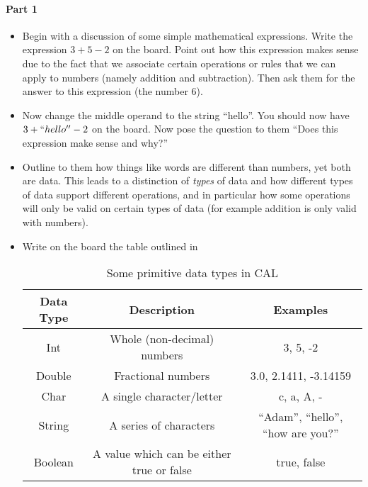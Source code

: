 	{
		\paragraph{Part 1}
		
		\begin{itemize}
			\item Begin with a discussion of some simple mathematical expressions.  Write the expression \(3 + 5 - 2\) on the board.  Point out how this expression makes sense due to the fact that we associate certain operations or rules that we can apply to numbers (namely addition and subtraction).  Then ask them for the answer to this expression (the number 6).
			\item Now change the middle operand to the string ``hello''.  You should now have \(3 + ``hello'' - 2\) on the board.  Now pose the question to them ``Does this expression make sense and why?''
			\item Outline to them how things like words are different than numbers, yet both are data.  This leads to a distinction of \emph{types} of data and how different types of data support different operations, and in particular how some operations will only be valid on certain types of data (for example addition is only valid with numbers).
			\item Write on the board the table outlined in 
			
\begin{table}
  \centering
  \begin{tabular}{c|c|c}
    \hline
    Data Type & Description & Examples\\ \hline
    Int & Whole (non-decimal) numbers & 3, 5, -2\\
    Double & Fractional numbers & 3.0, 2.1411, -3.14159\\
    Char & A single character/letter & c, a, A, -\\
    String & A series of characters & ``Adam'', ``hello'', ``how are you?''\\
    Boolean & A value which can be either true or false & true, false\\ 
    \hline
  \end{tabular}
  \caption{Some primitive data types in CAL}
  \label{calPrimitiveTypes}
\end{table}
			

\end{itemize}}
